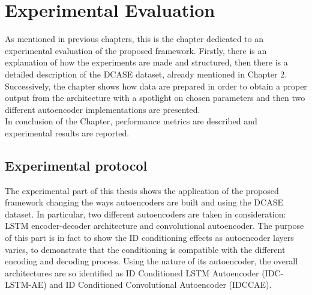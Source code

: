 \chapter{Experimental Evaluation}
As mentioned in previous chapters, this is the chapter dedicated to an experimental evaluation of the proposed framework. Firstly, there is an explanation of how the experiments are made and structured, then there is a detailed description of the DCASE dataset, already mentioned in Chapter 2. Successively, the chapter shows how data are prepared in order to obtain a proper output from the architecture with a spotlight on chosen parameters and then two different autoencoder implementations are presented.\\
In conclusion of the Chapter, performance metrics are described and experimental results are reported.
\section{Experimental protocol}
The experimental part of this thesis shows the application of the proposed framework changing the ways autoencoders are built and using the DCASE dataset. In particular, two different autoencoders are taken in consideration: LSTM encoder-decoder architecture and convolutional autoencoder. The purpose of this part is in fact to show the ID conditioning effects as autoencoder layers varies, to demonstrate that the conditioning is compatible with the different encoding and decoding process. Using the nature of its autoencoder, the overall architectures are so identified as ID Conditioned LSTM Autoencoder (IDC-LSTM-AE) and ID Conditioned Convolutional Autoencoder (IDCCAE).
